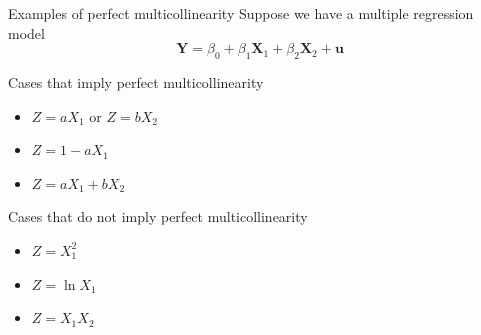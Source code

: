 \documentclass[presentation,10pt]{beamer}
\begin{document}
\begin{frame}[label={sec:org185b6b1}]{Examples of perfect multicollinearity}
Suppose we have a multiple regression model
\[ \mathbf{Y} = \beta_0 + \beta_1 \mathbf{X}_1 + \beta_2
\mathbf{X}_2 + \mathbf{u}  \]

\begin{block}{Cases that imply perfect multicollinearity}
\begin{itemize}
\item \(Z = a X_1\) or \(Z = b X_2\)
\item \(Z = 1 - a X_1\)
\item \(Z = a X_1 + b X_2\)
\end{itemize}
\end{block}

\begin{block}{Cases that do not imply perfect multicollinearity}
\begin{itemize}
\item \(Z = X_1^2\)
\item \(Z = \ln X_1\)
\item \(Z = X_1 X_2\)
\end{itemize}
\end{block}
\end{frame}
\end{document}
